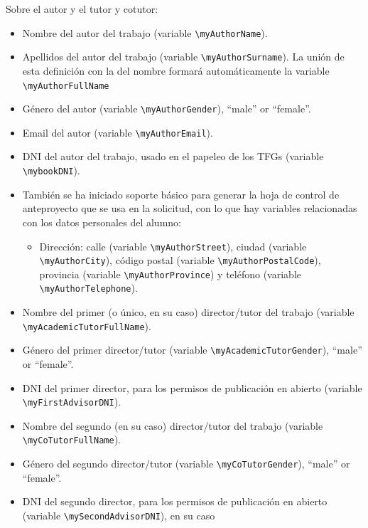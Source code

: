 Sobre el autor y el tutor y cotutor:

\begin{itemize}
  
  \item Nombre del autor del trabajo (variable \texttt{\textbackslash{}myAuthorName}).
  \item Apellidos del autor del trabajo (variable \texttt{\textbackslash{}myAuthorSurname}). La unión de esta definición con la del nombre formará automáticamente la variable \texttt{\textbackslash{}myAuthorFullName}
  \item Género del autor (variable \texttt{\textbackslash{}myAuthorGender}), ``male'' or ``female''.
  \item Email del autor (variable \texttt{\textbackslash{}myAuthorEmail}).
  \item DNI del autor del trabajo, usado en el papeleo de los TFGs (variable \texttt{\textbackslash{}mybookDNI}).

  \item También se ha iniciado soporte básico para generar la hoja de control de anteproyecto que se usa en la solicitud, con lo que hay variables relacionadas con los datos personales del alumno:

        \begin{itemize}
          \item Dirección: calle (variable \texttt{\textbackslash{}myAuthorStreet}), ciudad (variable \texttt{\textbackslash{}myAuthorCity}), código postal (variable \texttt{\textbackslash{}myAuthorPostalCode}), provincia (variable \texttt{\textbackslash{}myAuthorProvince}) y teléfono (variable \texttt{\textbackslash{}myAuthorTelephone}).
        \end{itemize}

  \item Nombre del primer (o único, en su caso) director/tutor del trabajo (variable \texttt{\textbackslash{}myAcademicTutorFullName}).
  \item Género del primer director/tutor (variable \texttt{\textbackslash{}myAcademicTutorGender}), ``male'' or ``female''.
  \item DNI del primer director, para los permisos de publicación en abierto (variable \texttt{\textbackslash{}myFirstAdvisorDNI}).

  
  \item Nombre del segundo (en su caso) director/tutor del trabajo (variable \texttt{\textbackslash{}myCoTutorFullName}).
  \item Género del segundo director/tutor (variable \texttt{\textbackslash{}myCoTutorGender}), ``male'' or ``female''.
  \item DNI del segundo director, para los permisos de publicación en abierto (variable \texttt{\textbackslash{}mySecondAdvisorDNI}), en su caso

\end{itemize}

